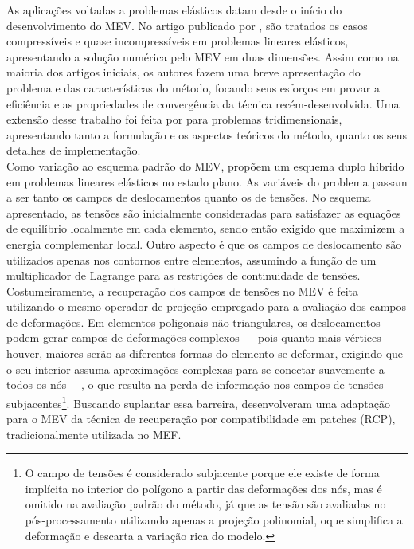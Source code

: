 \indent As aplicações voltadas a problemas elásticos datam desde o início do desenvolvimento do MEV. No artigo publicado por \citet{virtualelementslinearelasticityproblems2013}, são tratados os casos compressíveis e quase incompressíveis em problemas lineares elásticos, apresentando a solução numérica pelo MEV em duas dimensões. Assim como na maioria dos artigos iniciais, os autores fazem uma breve apresentação do problema e das características do método, focando seus esforços em provar a eficiência e as propriedades de convergência da técnica recém-desenvolvida. Uma extensão desse trabalho foi feita por \citet{gain2014virtual} para problemas tridimensionais, apresentando tanto a formulação e os aspectos teóricos do método, quanto os seus detalhes de implementação. \\
\indent Como variação ao esquema padrão do MEV, \citet{dualhybridvirtualelementmethodplaneelasticityproblems2020} propõem um esquema duplo híbrido em problemas lineares elásticos no estado plano. As variáveis do problema passam a ser tanto os campos de deslocamentos quanto os de tensões. No esquema apresentado, as tensões são inicialmente consideradas para satisfazer as equações de equilíbrio localmente em cada elemento, sendo então exigido que maximizem a energia complementar local. Outro aspecto é que os campos de deslocamento são utilizados apenas nos contornos entre elementos, assumindo a função de um multiplicador de Lagrange para as restrições de continuidade de tensões. \\
\indent Costumeiramente, a recuperação dos campos de tensões no MEV é feita utilizando o mesmo operador de projeção empregado para a avaliação dos campos de deformações. Em elementos poligonais não triangulares, os deslocamentos podem gerar campos de deformações complexos — pois quanto mais vértices houver, maiores serão as diferentes formas do elemento se deformar, exigindo que o seu interior assuma aproximações complexas para se conectar suavemente a todos os nós —, o que resulta na perda de informação nos campos de tensões subjacentes\footnote{O campo de tensões é considerado subjacente porque ele existe de forma implícita no interior do polígono a partir das deformações dos nós, mas é omitido na avaliação padrão do método, já que as tensão são avaliadas no pós-processamento utilizando apenas a projeção polinomial, oque simplifica a deformação e descarta a variação rica do modelo.}. Buscando suplantar essa barreira, \citet{equilibriumbasedstressrecoveryprocedurevem2019} desenvolveram uma adaptação para o MEV da técnica de recuperação por compatibilidade em patches (RCP), tradicionalmente utilizada no MEF.\\ %
